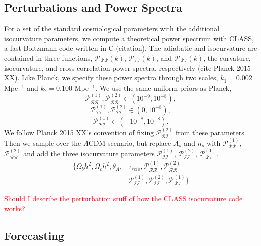 \documentclass[11pt,a4paper]{emulateapj}
\newcommand\writingnote[1]{\textcolor{red}{#1}}
\begin{document}
\subsection{Perturbations and Power Spectra}
For a set of the standard cosmological parameters with the additional isocurvature parameters, we compute a theoretical power spectrum with CLASS, a fast Boltzmann code written in C (citation). The adiabatic and isocurvature are contained in three functions, $\mathcal{P}_{\mathcal{RR}}(k)$, $\mathcal{P}_{\mathcal{II}}(k)$, and $\mathcal{P}_{\mathcal{RI}}(k)$, the curvature, isocurvature, and cross-correlation power spectra, respectively (cite Planck 2015 XX). Like Planck, we specify these power spectra through two scales, $k_1 = 0.002$ Mpc$^{-1}$ and $k_2 = 0.100$ Mpc$^{-1}$. We use the same uniform priors as Planck,
\begin{equation}
    \mathcal{P}_{\mathcal{RR}}^{(1)}, \mathcal{P}_{\mathcal{RR}}^{(2)} \in (10^{-9}, 10^{-8}),
\end{equation}
\begin{equation}
    \mathcal{P}_{\mathcal{II}}^{(1)}, \mathcal{P}_{\mathcal{II}}^{(2)} \in (0, 10^{-8}),
\end{equation}
\begin{equation}
    \mathcal{P}_{\mathcal{RI}}^{(1)} \in (-10^{-8}, 10^{-8}).
\end{equation}
We follow Planck 2015 XX's convention of fixing $\mathcal{P}_{\mathcal{RI}}^{(2)}$ from these parameters. Then we sample over the $\Lambda$CDM scenario, but replace $A_s$ and $n_s$ with $\mathcal{P}_{\mathcal{RR}}^{(1)}$,  $\mathcal{P}_{\mathcal{RR}}^{(2)}$ and add the three isocurvature parameters $\mathcal{P}_{\mathcal{II}}^{(1)}$, $\mathcal{P}_{\mathcal{II}}^{(2)}$, $\mathcal{P}_{\mathcal{RI}}^{(1)}$.
\begin{align}
\{ \Omega_b h^2, \Omega_c h^2, \theta_A, &\tau_{reio}, \mathcal{P}_{\mathcal{RR}}^{(1)}, \mathcal{P}_{\mathcal{RR}}^{(2)} \\
& \mathcal{P}_{\mathcal{II}}^{(1)}, \mathcal{P}_{\mathcal{II}}^{(2)}, \mathcal{P}_{\mathcal{RI}}^{(1)}    \}
\end{align}

\writingnote{Should I describe the perturbation stuff of how the CLASS isocurvature code works?}



\subsection{Forecasting}
\end{document}
